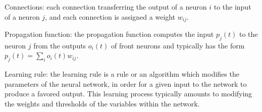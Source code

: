 \documentclass[a4paper,12pt]{article}
\begin{document}
Connections: each connection transferring the output of a neuron $i$ to the input of a neuron $j$, and each connection is assigned a weight $w_{ij}$.
\par
Propagation function: the propagation function computes the input $p_j(t)$ to the neuron $j$ from the outputs $o_i(t)$ of front neurons and typically has the form $p_j(t) = \sum\limits_{i}o_i(t)w_{ij}$.
\par
Learning rule: the learning rule is a rule or an algorithm which modifies the parameters of the neural network, in order for a given input to the network to produce a favored output. This learning process typically amounts to modifying the weights and thresholds of the variables within the network.


\end{document}
